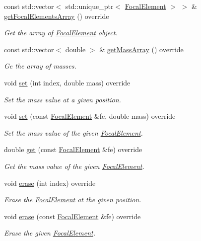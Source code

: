 \begin{DoxyCompactItemize}
const std\+::vector$<$ std\+::unique\+\_\+ptr$<$ \hyperlink{classFocalElement}{Focal\+Element} $>$ $>$ \& \hyperlink{classGenericFocalElementContainer_a2db442b704235b974d96cd5670ab1630}{get\+Focal\+Elements\+Array} () override
\begin{DoxyCompactList}\small\item\em Get the array of \hyperlink{classFocalElement}{Focal\+Element} object. \end{DoxyCompactList}\item 
const std\+::vector$<$ double $>$ \& \hyperlink{classGenericFocalElementContainer_a0ae8e8ad18f3d8c09db25688f2da684b}{get\+Mass\+Array} () override
\begin{DoxyCompactList}\small\item\em Ge the array of masses. \end{DoxyCompactList}\item 
void \hyperlink{classGenericFocalElementContainer_ae764ae489ed94b366de805a3a45278b9}{set} (int index, double mass) override
\begin{DoxyCompactList}\small\item\em Set the mass value at a given position. \end{DoxyCompactList}\item 
void \hyperlink{classGenericFocalElementContainer_a33d167fa35d3e19ec214560c281681ea}{set} (const \hyperlink{classFocalElement}{Focal\+Element} \&fe, double mass) override
\begin{DoxyCompactList}\small\item\em Set the mass value of the given \hyperlink{classFocalElement}{Focal\+Element}. \end{DoxyCompactList}\item 
double \hyperlink{classGenericFocalElementContainer_a3a9fd25120f480a33770e52d198ecc33}{get} (const \hyperlink{classFocalElement}{Focal\+Element} \&fe) override
\begin{DoxyCompactList}\small\item\em Get the mass value of the given \hyperlink{classFocalElement}{Focal\+Element}. \end{DoxyCompactList}\item 
void \hyperlink{classGenericFocalElementContainer_a123f043d029c636824e4ca8153cd6aea}{erase} (int index) override
\begin{DoxyCompactList}\small\item\em Erase the \hyperlink{classFocalElement}{Focal\+Element} at the given position. \end{DoxyCompactList}\item 
void \hyperlink{classGenericFocalElementContainer_a5bef7f21bc02455dd0cde6dbef69541a}{erase} (const \hyperlink{classFocalElement}{Focal\+Element} \&fe) override
\begin{DoxyCompactList}\small\item\em Erase the given \hyperlink{classFocalElement}{Focal\+Element}. \end{DoxyCompactList}\end{DoxyCompactItemize}


